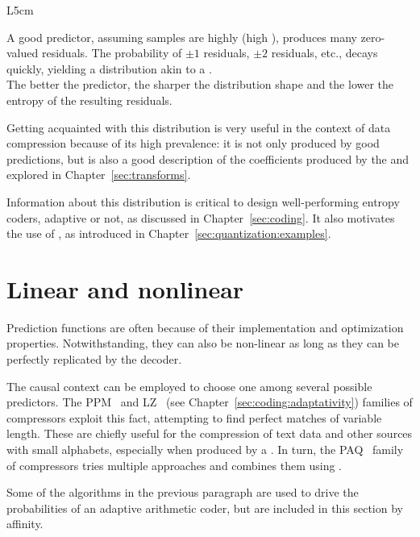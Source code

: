 \begin{wrapfigure}{L}{5cm}

\end{wrapfigure}

A good predictor, assuming samples are highly  (high ), produces many zero-valued residuals. The probability of $\pm 1$ residuals, $\pm 2$ residuals, etc., decays quickly, yielding a distribution akin to a \mbox{}.\\
%
The better the predictor, the sharper the distribution shape and the lower the entropy of the resulting residuals.

Getting acquainted with this distribution is very useful in the context of data compression because of its high prevalence: it is not only produced by good predictions, but is also a good description of the coefficients produced by the  and  explored in Chapter~\ref{sec:transforms}.

Information about this distribution is critical to design well-performing entropy coders, adaptive or not, as discussed in Chapter~\ref{sec:coding}. It also motivates the use of , as introduced in Chapter~\ref{sec:quantization:examples}.

\section{Linear and nonlinear}

Prediction functions are often  because of their implementation and optimization properties. Notwithstanding, they can also be non-linear as long as they can be perfectly replicated by the decoder.

The causal context can be employed to choose one among several possible predictors. The PPM~\cite{cleary_ppm} and LZ~\cite{lz77} (see Chapter~\ref{sec:coding:adaptativity}) families of compressors exploit this fact, attempting to find perfect matches of variable length. These are chiefly useful for the compression of text data and other sources with small alphabets, especially when produced by a . In turn, the PAQ~\cite{mahoney_paq1} family of compressors tries multiple approaches and combines them using .

\begin{remark}
Some of the algorithms in the previous paragraph are used to drive the probabilities of an adaptive arithmetic coder, but are included in this section by affinity.
\end{remark}


